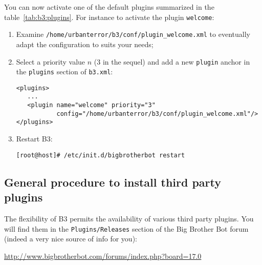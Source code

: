 \noindent You can now activate one of the default plugins summarized in the
table~\ref{tab:b3:plugins}.  For instance to activate the plugin
\texttt{welcome}: 
\begin{enumerate}\setitemsep
\item Examine \texttt{/home/urbanterror/b3/conf/plugin\_welcome.xml} to
  eventually adapt the configuration to suits your needs;
\item Select a priority value $n$ (3 in the sequel) and add a new
  \texttt{plugin} anchor in the \texttt{plugins} section of \texttt{b3.xml}:
  \begin{lstlisting}[style=apachecfg]
<plugins>
   ...
   <plugin name="welcome" priority="3" 
           config="/home/urbanterror/b3/conf/plugin_welcome.xml"/>
</plugins>
  \end{lstlisting}
\item Restart B3:
\begin{lstlisting}[style=command]
[root@host]# /etc/init.d/bigbrotherbot restart
\end{lstlisting}
\end{enumerate}

\subsection{General procedure to install third party plugins}
\label{sec:b3:extplugins}

The flexibility of B3 permits the availability of various third party plugins. 
You will find them in the \texttt{Plugins/Releases} section of the Big Brother Bot forum
(indeed a very nice source of info for you): 
\begin{center}
  \url{http://www.bigbrotherbot.com/forums/index.php?board=17.0}
\end{center}

